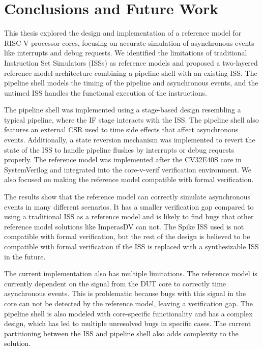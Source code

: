 \chapter{Conclusions and Future Work}
\label{ch:conclusion}

This thesis explored the design and implementation of a reference model for RISC-V processor cores, focusing on accurate simulation of asynchronous events like interrupts and debug requests. We identified the limitations of traditional Instruction Set Simulators (ISSs) as reference models and proposed a two-layered reference model architecture combining a pipeline shell with an existing ISS. The pipeline shell models the timing of the pipeline and asynchronous events, and the untimed ISS handles the functional execution of the instructions. 

The pipeline shell was implemented using a stage-based design resembling a typical pipeline, where the IF stage interacts with the ISS. The pipeline shell also features an external CSR used to time side effects that affect asynchronous events. Additionally, a state reversion mechanism was implemented to revert the state of the ISS to handle pipeline flushes by interrupts or debug requests properly.
The reference model was implemented after the CV32E40S core in SystemVerilog and integrated into the core-v-verif verification environment. We also focused on making the reference model compatible with formal verification.

The results show that the reference model can correctly simulate asynchronous events in many different scenarios. It has a smaller verification gap compared to using a traditional ISS as a reference model and is likely to find bugs that other reference model solutions like ImperasDV can not. The Spike ISS used is not compatible with formal verification, but the rest of the design is believed to be compatible with formal verification if the ISS is replaced with a synthesizable ISS in the future. 

The current implementation also has multiple limitations. The reference model is currently dependent on the  signal from the DUT core to correctly time asynchronous events. This is problematic because bugs with this signal in the core can not be detected by the reference model, leaving a verification gap. The pipeline shell is also modeled with core-specific functionality and has a complex design, which has led to multiple unresolved bugs in specific cases. The current partitioning between the ISS and pipeline shell also adds complexity to the solution.%

